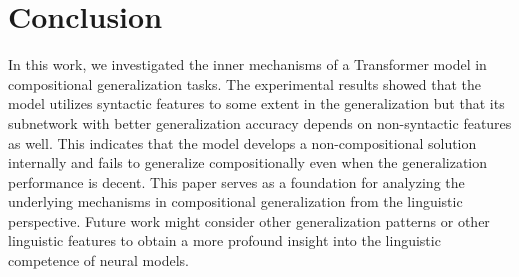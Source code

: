 \section{Conclusion}
\label{sec:conclusion}
In this work, we investigated the inner mechanisms of a Transformer model in compositional generalization tasks.
The experimental results showed that the model utilizes syntactic features to some extent in the generalization but that its subnetwork with better generalization accuracy depends on non-syntactic features as well.
This indicates that the model develops a non-compositional solution internally and fails to generalize compositionally even when the generalization performance is decent.
This paper serves as a foundation for analyzing the underlying mechanisms in compositional generalization from the linguistic perspective.
Future work might consider other generalization patterns or other linguistic features to obtain a more profound insight into the linguistic competence of neural models.